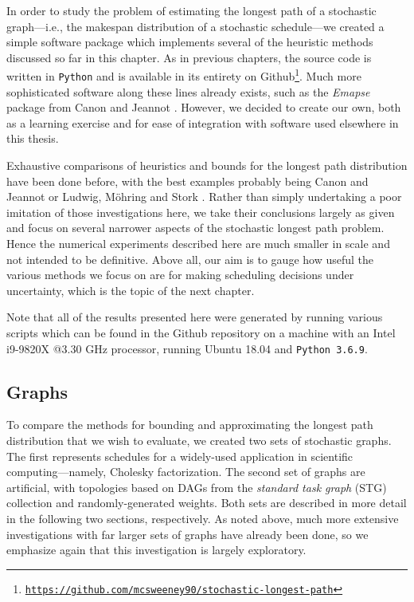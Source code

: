 \documentclass[12pt]{article}
\begin{document}
In order to study the problem of estimating the longest path of a stochastic graph---i.e., the makespan distribution of a stochastic schedule---we created a simple software package which implements several of the heuristic methods discussed so far in this chapter. As in previous chapters, the source code is written in {\tt Python} and is available in its entirety on Github\footnote{\href{https://github.com/mcsweeney90/stochastic-longest-path}{{\tt \small https://github.com/mcsweeney90/stochastic-longest-path}}}. Much more sophisticated software along these lines already exists, such as the {\em Emapse} package from Canon and Jeannot \cite{can16}. However, we decided to create our own, both as a learning exercise and for ease of integration with software used elsewhere in this thesis. 

Exhaustive comparisons of heuristics and bounds for the longest path distribution have been done before, with the best examples probably being Canon and Jeannot \cite{can16} or Ludwig, M{\"o}hring and Stork \cite{lud01}. Rather than simply undertaking a poor imitation of those investigations here, we take their conclusions largely as given and focus on several narrower aspects of the stochastic longest path problem. Hence the numerical experiments described here are much smaller in scale and not intended to be definitive. Above all, our aim is to gauge how useful the various methods we focus on are for making scheduling decisions under uncertainty, which is the topic of the next chapter.

Note that all of the results presented here were generated by running various scripts which can be found in the Github repository on a machine with an Intel i9-9820X @3.30 GHz processor, running Ubuntu 18.04 and {\tt Python 3.6.9}. 

\subsection{Graphs}
\label{subsect.graphs}

To compare the methods for bounding and approximating the longest path distribution that we wish to evaluate, we created two sets of stochastic graphs. The first represents schedules for a widely-used application in scientific computing---namely, Cholesky factorization. The second set of graphs are artificial, with topologies based on DAGs from the {\em standard task graph} (STG) collection \cite{tob02} and randomly-generated weights. Both sets are described in more detail in the following two sections, respectively. As noted above, much more extensive investigations with far larger sets of graphs have already been done, so we emphasize again that this investigation is largely exploratory.
\end{document}
